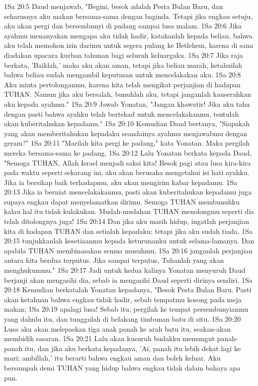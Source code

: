 1Sa 20:5  Daud menjawab, "Begini, besok adalah Pesta Bulan Baru, dan seharusnya aku makan bersama-sama dengan baginda. Tetapi jika engkau setuju, aku akan pergi dan bersembunyi di padang sampai lusa malam.
1Sa 20:6  Jika ayahmu menanyakan mengapa aku tidak hadir, katakanlah kepada beliau, bahwa aku telah memohon izin darimu untuk segera pulang ke Betlehem, karena di sana diadakan upacara kurban tahunan bagi seluruh keluargaku.
1Sa 20:7  Jika raja berkata, 'Baiklah,' maka aku akan aman, tetapi jika beliau marah, ketahuilah bahwa beliau sudah mengambil keputusan untuk mencelakakan aku.
1Sa 20:8  Aku minta pertolonganmu, karena kita telah mengikat perjanjian di hadapan TUHAN. Namun jika aku bersalah, bunuhlah aku, tetapi janganlah kauserahkan aku kepada ayahmu."
1Sa 20:9  Jawab Yonatan, "Jangan khawatir! Jika aku tahu dengan pasti bahwa ayahku telah bertekad untuk mencelakakanmu, tentulah akan kuberitahukan kepadamu."
1Sa 20:10  Kemudian Daud bertanya, "Siapakah yang akan memberitahukan kepadaku seandainya ayahmu menjawabmu dengan geram?"
1Sa 20:11  "Marilah kita pergi ke padang," kata Yonatan. Maka pergilah mereka bersama-sama ke padang.
1Sa 20:12  Lalu Yonatan berkata kepada Daud, "Semoga TUHAN, Allah Israel menjadi saksi kita! Besok pagi atau lusa kira-kira pada waktu seperti sekarang ini, aku akan berusaha mengetahui isi hati ayahku. Jika ia bersikap baik terhadapmu, aku akan mengirim kabar kepadamu.
1Sa 20:13  Jika ia berniat mencelakakanmu, pasti akan kuberitahukan kepadamu juga supaya engkau dapat menyelamatkan dirimu. Semoga TUHAN membunuhku kalau hal itu tidak kulakukan. Mudah-mudahan TUHAN menolongmu seperti dia telah ditolongnya juga!
1Sa 20:14  Dan jika aku masih hidup, ingatlah perjanjian kita di hadapan TUHAN dan setialah kepadaku; tetapi jika aku sudah tiada,
1Sa 20:15  tunjukkanlah kesetiaanmu kepada keturunanku untuk selama-lamanya. Dan apabila TUHAN membinasakan semua musuhmu,
1Sa 20:16  janganlah perjanjian antara kita berdua terputus. Jika sampai terputus, Tuhanlah yang akan menghukummu."
1Sa 20:17  Jadi untuk kedua kalinya Yonatan menyuruh Daud berjanji akan mengasihi dia, sebab ia mengasihi Daud seperti dirinya sendiri.
1Sa 20:18  Kemudian berkatalah Yonatan kepadanya, "Besok Pesta Bulan Baru. Pasti akan ketahuan bahwa engkau tidak hadir, sebab tempatmu kosong pada meja makan;
1Sa 20:19  apalagi lusa! Sebab itu, pergilah ke tempat persembunyianmu yang dahulu itu, dan tunggulah di belakang timbunan batu di situ.
1Sa 20:20  Lusa aku akan melepaskan tiga anak panah ke arah batu itu, seakan-akan membidik sasaran.
1Sa 20:21  Lalu akan kusuruh budakku memungut panah-panah itu, dan jika aku berkata kepadanya, 'Ai, panah itu lebih dekat lagi ke mari; ambillah,' itu berarti bahwa engkau aman dan boleh keluar. Aku bersumpah demi TUHAN yang hidup bahwa engkau tidak dalam bahaya apa pun.
